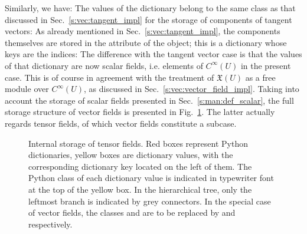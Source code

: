 Similarly, we have:
The values of the dictionary  belong to the same class
 as that discussed in Sec.~\ref{s:vec:tangent_impl} for
the storage of components of tangent vectors:
As already mentioned in Sec.~\ref{s:vec:tangent_impl}, the components themselves are stored
in the attribute  of the  object; this is a dictionary
whose keys are the indices:
The difference with the tangent vector case is that the values of that dictionary are now scalar fields, i.e. elements of $C^\infty(U)$ in the present case. This is of course in agreement with the treatment of $\mathfrak{X}(U)$ as a free module over $C^\infty(U)$,
as discussed in Sec.~\ref{s:vec:vector_field_impl}.
Taking into account the storage of scalar fields presented in Sec.~\ref{s:man:def_scalar},
the full storage structure of vector fields is presented in Fig.~\ref{f:vec:storage_tensor}.
The latter actually regards tensor fields, of which vector fields constitute a subcase.

\begin{figure}
\begin{center}

\end{center}
\caption{\label{f:vec:storage_tensor} \footnotesize
Internal storage of tensor fields. Red boxes
represent Python dictionaries, yellow boxes are dictionary values, with the corresponding
dictionary key located on the left of them.
The Python class of each dictionary value is indicated in typewriter font at the top of the
yellow box. In the hierarchical tree, only the leftmost
branch is indicated by grey connectors. In the special case of vector fields, the classes
 and  are to be replaced by  and  respectively.}
\end{figure}

